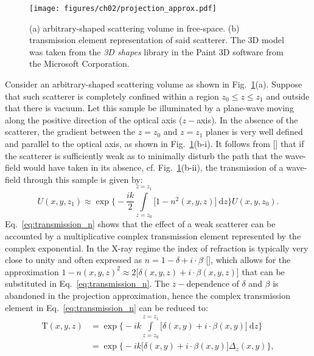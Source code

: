 \begin{refsection}
\begin{figure}[t]
    \centering
    {\texttt{[image: figures/ch02/projection\_approx.pdf]}}
    \caption[Transmission elements]{(a) arbitrary-shaped scattering volume in free-space. (b) transmission element representation of said scatterer. The 3D model was taken from the \textit{3D shapes} library in the Paint 3D software from the Microsoft Corporation.}
    \label{fig:projection}
\end{figure}
Consider an arbitrary-shaped scattering volume as shown in Fig.~\ref{fig:projection}(a). Suppose that such scatterer is completely confined within a region $z_0\leq z\leq z_1$ and outside that there is vacuum. Let this sample be illuminated by a plane-wave moving along the positive direction of the optical axis ($z-$axis). In the absence of the scatterer, the gradient between the $z=z_0$ and $z=z_1$ planes is very well defined and parallel to the optical axis, as shown in Fig.~\ref{fig:projection}(b-$\mathrm{i}$). It follows from [\cite[\textit{§2.2}]{Paganin2006}] that if the scatterer is sufficiently weak as to minimally disturb the path that the wave-field would have taken in its absence, cf. Fig.~\ref{fig:projection}(b-$\mathrm{ii}$), the transmission of a wave-field through this sample is given by:
\begin{equation}\label{eq:transmission_n}
    U(x,y,z_1)\approx\exp\Bigg\{-\frac{ik}{2}\int\limits_{z=z_0}^{z=z_1}{\big[1-n^2(x,y,z)\big]~\mathrm{d}z}\Bigg\}U(x,y,z_0).
\end{equation}{}
Eq.~\ref{eq:transmission_n} shows that the effect of a weak scatterer can be accounted by a multiplicative complex transmission element represented by the complex exponential. In the X-ray regime the index of refraction is typically very close to unity and often expressed as $n=1-\delta+i\cdot\beta$ [\cite[\textit{§1.6}]{Als-Nielsen2011}], which allows for the approximation $1-n(x,y,z)^2\approx2\big[\delta(x,y,z)+i\cdot\beta(x,y,z)\big]$ that can be substituted in Eq.~\ref{eq:transmission_n}. The $z-$dependence of $\delta$ and $\beta$ is abandoned in the projection approximation, hence the complex transmission element in Eq.~\ref{eq:transmission_n} can be reduced to:
\begin{align}\label{eq:transmission}
\mathrm{T}(x,y,z) &=\exp\Bigg\{-ik\int\limits_{z=z_0}^{z=z_1}{\big[\delta(x,y)+i\cdot\beta(x,y)\big]~\mathrm{d}z}\Bigg\}\nonumber\\
         &=\exp\Bigg\{-ik\big[\delta(x,y)+i\cdot\beta(x,y)\big]\Delta_z(x,y)\Bigg\},\nonumber\\

\end{align}
\end{refsection}

